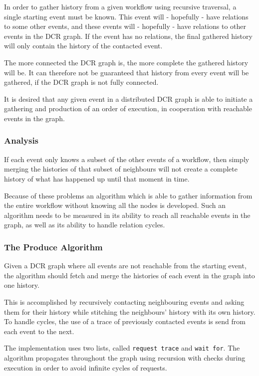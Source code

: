 	In order to gather history from a given workflow using recursive traversal, a single starting event must be known. This event will - hopefully - have relations to some other events, and these events will - hopefully - have relations to other events in the DCR graph.
	If the event has no relations, the final gathered history will only contain the history of the contacted event. 
	
	The more connected the DCR graph is, the more complete the gathered history will be. It can therefore not be guaranteed that history from every event will be gathered, if the DCR graph is not fully connected.  
	
	It is desired that any given event in a distributed DCR graph is able to initiate a gathering and production of an order of execution, in cooperation with reachable events in the graph. 
	
	\subsubsection{Analysis}
	If each event only knows a subset of the other events of a workflow, then simply merging the histories of that subset of neighbours will not create a complete history of what has happened up until that moment in time. 
	
	Because of these problems an algorithm which is able to gather information from the entire workflow without knowing all the nodes is developed. Such an algorithm needs to be measured in its ability to reach all reachable events in the graph, as well as its ability to handle relation cycles. 
	
	\subsubsection{The Produce Algorithm}
	Given a DCR graph where all events are not reachable from the starting event, the algorithm should fetch and merge the histories of each event in the graph into one history.
	
	This is accomplished by recursively contacting neighbouring events and asking them for their history while stitching the neighbours' history with its own history. To handle cycles, the use of a trace of previously contacted events is send from each event to the next.
	
	\newpar The implementation uses two lists, called \texttt{request trace} and \texttt{wait for}.
	The algorithm propagates throughout the graph using recursion with checks during execution in order to avoid infinite cycles of requests. 
	
